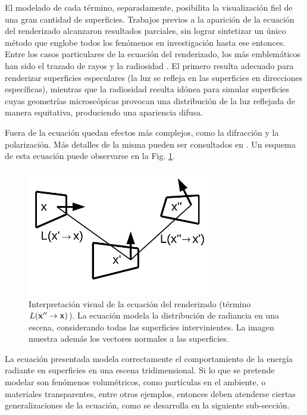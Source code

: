 El modelado de cada término, separadamente, posibilita la visualización fiel de una gran cantidad de superficies.
Trabajos previos a la aparición de la ecuación del renderizado alcanzaron resultados parciales, sin lograr sintetizar un único método que englobe todos los fenómenos en investigación hasta ese entonces.
Entre los casos particulares de la ecuación del renderizado, los más emblemáticos han sido el trazado de rayos \cite{Whitted1980} y la radiosidad \cite{Goral1984}.
El primero resulta adecuado para renderizar superficies especulares (la luz se refleja en las superficies en direcciones específicas), mientras que la radiosidad resulta idónea para simular superficies cuyas geometrías microscópicas provocan una distribución de la luz reflejada de manera equitativa, produciendo una apariencia difusa.

Fuera de la ecuación quedan efectos más complejos, como la difracción y la polarización.
Más detalles de la misma pueden ser consultados en \cite{Kajiya1986}.
Un esquema de esta ecuación puede observarse en la Fig. \ref{fg:rendequation}.

\begin{figure}
\center
\includegraphics[width=8cm]{figures/rendequation}
\caption[Interpretación visual de la ecuación del renderizado]{Interpretación visual de la ecuación del renderizado (término $L(\bold{x''}  \rightarrow \bold{x}) $). La ecuación modela la distribución de radiancia en una escena, considerando todas las superficies intervinientes. La imagen muestra además los vectores normales a las superficies.}
\label{fg:rendequation}
\end{figure}

La ecuación presentada modela correctamente el comportamiento de la energía radiante en superficies en una escena tridimensional.
Si lo que se pretende modelar son fenómenos volumétricos, como partículas en el ambiente, o materiales transparentes, entre otros ejemplos, entonces deben atenderse ciertas generalizaciones de la ecuación, como se desarrolla en la siguiente sub-sección.

